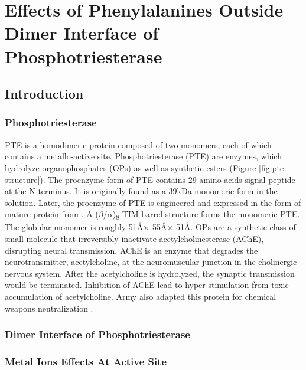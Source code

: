 \chapter{Effects of Phenylalanines Outside Dimer Interface of Phosphotriesterase}
\label{chap:dimer}
\begin{refsection}

\section{Introduction}

\subsection{Phosphotriesterase}

PTE is a homodimeric protein composed of two monomers, each of which contains a
metallo-active site. Phosphotriesterase (PTE) are enzymes, which hydrolyze
organophosphates (OPs) as well as synthetic esters (Figure
\ref{fig:pte-structure})\cite{Ghanem2005a}. The proenzyme form of PTE contains
29 amino acids signal peptide at the N-terminus. It is originally found as a
39kDa monomeric form in the solution\cite{Mulbry1989}. Later, the proenzyme of
PTE is engineered and expressed in the form of mature protein from . A ($\beta$/$\alpha$)\textsubscript{8} TIM-barrel structure forms the
monomeric PTE\cite{Roodveldt2005,Seibert2005}. The globular monomer is roughly
51\AA $\times$ 55\AA $\times$ 51\AA.  OPs are a synthetic class of small molecule
that irreversibly inactivate acetylcholinesterase (AChE), disrupting
neural transmission. AChE is an enzyme that degrades the neurotransmitter,
acetylcholine, at the neuromuscular junction in the cholinergic nervous system.
After the acetylcholine is hydrolyzed, the synaptic transmission would be
terminated. Inhibition of AChE lead to hyper-stimulation from toxic
accumulation of acetylcholine\cite{Soreq2001}. Army also adapted this protein
for chemical weapons neutralization \cite{Yang2014a}.

\subsection{Dimer Interface of Phosphotriesterase}



\subsection{Metal Ions Effects At Active Site}


\end{refsection}
